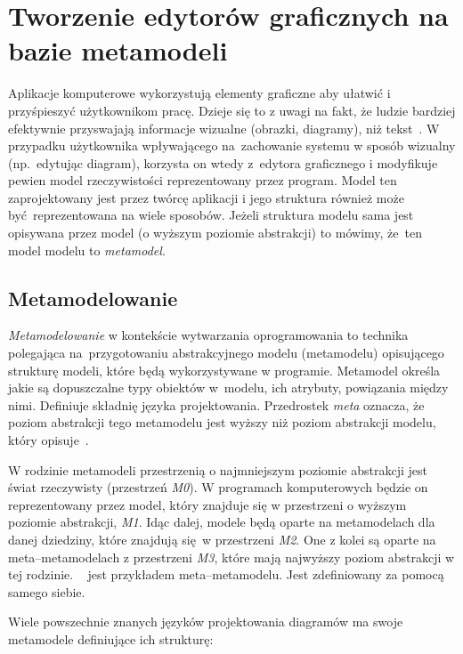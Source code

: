 \chapter{Tworzenie edytorów graficznych na bazie metamodeli}

Aplikacje komputerowe wykorzystują elementy graficzne aby ułatwić i
przyśpieszyć użytkownikom pracę.
Dzieje się to z uwagi na fakt, że ludzie bardziej efektywnie przyswajają
informacje wizualne (obrazki, diagramy), niż
tekst~\cite{images-more-effective-article}.
W przypadku użytkownika
wpływającego na~zachowanie systemu w sposób wizualny (np.\ edytując diagram),
korzysta on wtedy z~edytora graficznego i modyfikuje pewien model
rzeczywistości reprezentowany przez program. Model ten zaprojektowany jest
przez twórcę aplikacji i jego struktura również może być~reprezentowana na
wiele sposobów. Jeżeli struktura modelu sama jest opisywana przez model (o
wyższym poziomie abstrakcji) to mówimy, że~ten model modelu to
\emph{metamodel}.

\section{Metamodelowanie}

\emph{Metamodelowanie} w kontekście wytwarzania oprogramowania to
technika polegająca
na~przygotowaniu abstrakcyjnego modelu (metamodelu) opisującego strukturę
modeli, które będą wykorzystywane w programie. Metamodel określa jakie są
dopuszczalne typy obiektów w~modelu, ich atrybuty, powiązania między nimi.
Definiuje składnię języka projektowania. Przedrostek \emph{meta} oznacza, że
poziom abstrakcji tego metamodelu jest wyższy niż poziom abstrakcji modelu,
który opisuje~\cite{from-requirements-to-java-in-a-snap}.

W rodzinie metamodeli przestrzenią o najmniejszym poziomie abstrakcji jest
świat rzeczywisty (przestrzeń \emph{M0}). W programach komputerowych będzie on
reprezentowany przez model, który znajduje się w przestrzeni o wyższym poziomie
abstrakcji, \emph{M1}. Idąc dalej, modele będą oparte na metamodelach dla danej
dziedziny, które znajdują się w przestrzeni \emph{M2}. One z kolei są oparte na
meta--metamodelach %
z przestrzeni \emph{M3}, które mają najwyższy poziom
abstrakcji w tej rodzinie. ~\cite{mof-omg-specification} jest
przykładem meta--metamodelu. %
Jest zdefiniowany za pomocą samego siebie.

Wiele powszechnie znanych języków projektowania diagramów ma swoje metamodele
definiujące ich strukturę:

